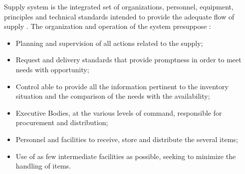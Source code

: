 
Supply system is the integrated set of organizations, personnel, equipment, principles and technical standards intended to provide the adequate flow of supply \cite{brasil2003}. The organization and operation of the system presuppose \cite{brasil2003}:

\begin{itemize}
\item Planning and supervision of all actions related to the supply;
\item Request and delivery standards that provide promptness in order to meet needs with opportunity;
\item Control able to provide all the information pertinent to the inventory situation and the comparison of the needs with the availability;
\item Executive Bodies, at the various levels of command, responsible for procurement and distribution;
\item Personnel and facilities to receive, store and distribute the several items;
\item Use of as few intermediate facilities as possible, seeking to minimize the handling of items.
\end{itemize}


